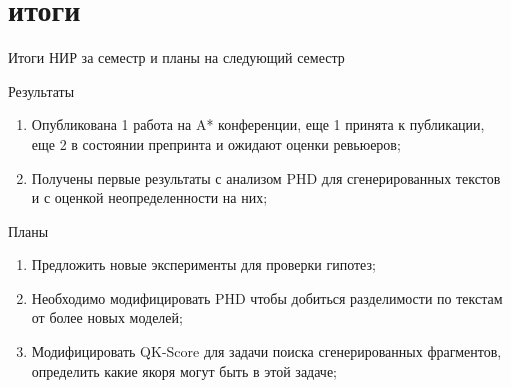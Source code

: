 \documentclass{beamer}
\begin{document}
\section{итоги}
\begin{frame}{Итоги НИР за семестр и планы на следующий семестр}
    \begin{block}{Результаты}
    \begin{enumerate}
        \item Опубликована 1 работа на A* конференции, еще 1 принята к публикации, еще 2 в состоянии препринта и ожидают оценки ревьюеров;
        \item Получены первые результаты с анализом PHD для сгенерированных текстов и с оценкой неопределенности на них;
    \end{enumerate}
    \end{block}

    \begin{block}{Планы}
    \begin{enumerate}
        \item Предложить новые эксперименты для проверки гипотез;
        \item Необходимо модифицировать PHD чтобы добиться разделимости по текстам от более новых моделей;
        \item Модифицировать QK-Score для задачи поиска сгенерированных фрагментов, определить какие якоря могут быть в этой задаче;
    \end{enumerate}
    \end{block}
    
\end{frame}

\end{document}
